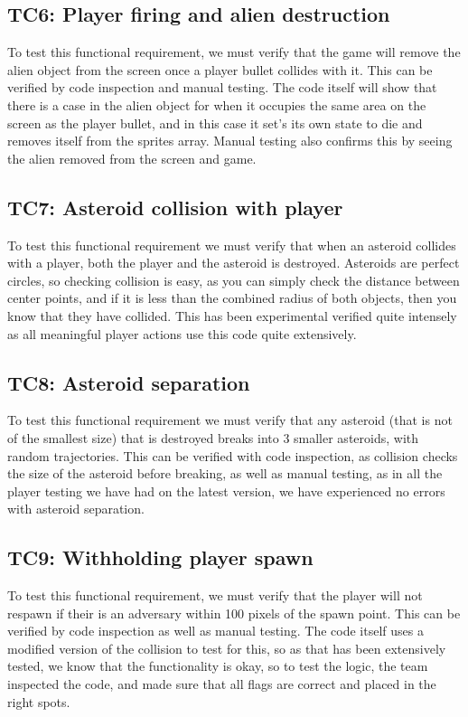 \documentclass[12pt, titlepage]{article}
\begin{document}
\subsection{TC6: Player firing and alien destruction}
To test this functional requirement, we must verify that the game will remove the alien object from the screen once a player bullet collides with it. This can be verified by code inspection and manual testing. The code itself will show that there is a case in the alien object for when it occupies the same area on the screen as the player bullet, and in this case it set's its own state to die and removes itself from the sprites array. Manual testing also confirms this by seeing the alien removed from the screen and game. \\
\subsection{TC7: Asteroid collision with player}
To test this functional requirement we must verify that when an asteroid collides with a player, both the player and the asteroid is destroyed. Asteroids are perfect circles, so checking collision is easy, as you can simply check the distance between center points, and if it is less than the combined radius of both objects, then you know that they have collided. This has been experimental verified quite intensely as all meaningful player actions use this code quite extensively.\\
\subsection{TC8: Asteroid separation}
To test this functional requirement we must verify that any asteroid (that is not of the smallest size) that is destroyed breaks into 3 smaller asteroids, with random trajectories. This can be verified with code inspection, as collision checks the size of the asteroid before breaking, as well as manual testing, as in all the player testing we have had on the latest version, we have experienced no errors with asteroid separation.
\subsection{TC9: Withholding player spawn}
To test this functional requirement, we must verify that the player will not respawn if their is an adversary within 100 pixels of the spawn point. This can be verified by code inspection as well as manual testing. The code itself uses a modified version of the collision to test for this, so as that has been extensively tested, we know that the functionality is okay, so to test the logic, the team inspected the code, and made sure that all flags are correct and placed in the right spots.
\end{document}
